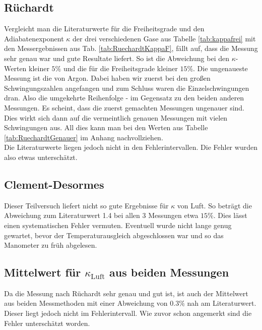 \documentclass[12pt,a4paper,titlepage,headinclude,bibtotoc]{scrartcl}
\begin{document}
\subsection{Rüchardt}
Vergleicht man die Literaturwerte für die Freiheitsgrade und den Adiabatenexponent $\kappa$ der drei verschiedenen Gase aus Tabelle \ref{tab:kappafrei} mit den Messergebnissen aus Tab. \ref{tab:RuechardtKappaF}, fällt auf, dass die Messung sehr genau war und gute Resultate liefert.
So ist die Abweichung bei den $\kappa$-Werten kleiner $5\%$ und die für die Freiheitsgrade kleiner $15\%$.
Die ungenaueste Messung ist die von Argon.
Dabei haben wir zuerst bei den großen Schwingungszahlen angefangen und zum Schluss waren die Einzelschwingungen dran.
Also die umgekehrte Reihenfolge - im Gegensatz zu den beiden anderen Messungen.
Es scheint, dass die zuerst gemachten Messungen ungenauer sind.
Dies wirkt sich dann auf die vermeintlich genauen Messungen mit vielen Schwingungen aus.
All dies kann man bei den Werten aus Tabelle \ref{tab:RuechardtGenauer} im Anhang nachvollziehen.\\
Die Literaturwerte liegen jedoch nicht in den Fehlerintervallen.
Die Fehler wurden also etwas unterschätzt.

\subsection{Clement-Desormes}
Dieser Teilversuch liefert nicht so gute Ergebnisse für $\kappa$ von Luft.
So beträgt die Abweichung zum Literaturwert 1.4 bei allen 3 Messungen etwa $15\%$.
Dies lässt einen systematischen Fehler vermuten.
Eventuell wurde nicht lange genug gewartet, bevor der Temperaturausgleich abgeschlossen war und so das Manometer zu früh abgelesen.

\subsection{Mittelwert für $\kappa_\text{Luft}$ aus beiden Messungen}
Da die Messung nach Rüchardt sehr genau und gut ist, ist auch der Mittelwert aus beiden Messmethoden mit einer Abweichung von $0.3\%$ nah am Literaturwert.
Dieser liegt jedoch nicht im Fehlerintervall.
Wie zuvor schon angemerkt sind die Fehler unterschätzt worden.
\end{document}
